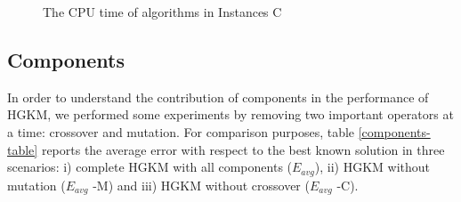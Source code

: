 \begin{figure}[H]
\centering
{}
\caption{The CPU time of algorithms in Instances C}
\label{fig:sizeC}
\end{figure}

\subsection{Components}
\label{sec:components}
In order to understand the contribution of components in the performance of HGKM, we performed some experiments by removing two important operators at a time: crossover and mutation. For comparison purposes, table \ref{components-table} reports the average error with respect to the best known solution in three scenarios: i) complete HGKM with all components ($E_{avg}$), ii) HGKM without mutation ($E_{avg}$ -M) and iii) HGKM without crossover ($E_{avg}$ -C).

